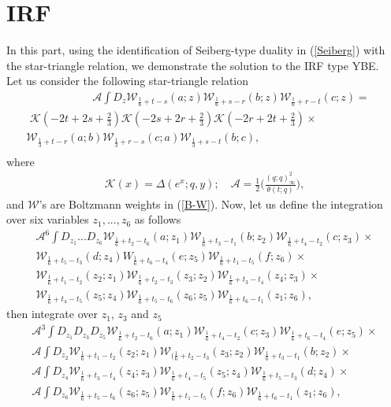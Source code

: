\documentclass[a4paper,11pt]{article}%
\numberwithin{equation}{section}
\begin{document}
\section{IRF } \label{AIRF} 
In this part, using the identification of  Seiberg-type duality in (\ref{Seiberg}) with the star-triangle relation, we demonstrate the solution to the IRF type YBE.\\Let us consider the following star-triangle relation
\begin{multline} \label{s-t1}
   \qquad \qquad  \qquad\mathcal{A}\int  D_z   \mathcal{W}_{\frac{1}{6}+t-s}(a;z)  \mathcal{W}_{\frac{1}{6}+s-r}(b;z)  \mathcal{W}_{\frac{1}{6}+r-t}(c;z)
     = \\ \,\,\mathcal{K}(-2t+2s+\frac{2}{3})\mathcal{K}(-2s+2r+\frac{2}{3})\mathcal{K}(-2r+2t+\frac{2}{3}) \times\qquad\qquad\qquad\\
      \mathcal{W}_{\frac{1}{3}+t-r}(a;b) \mathcal{W}_{\frac{1}{3}+r-s}(c;a) \mathcal{W}_{\frac{1}{3}+s-t}(b;c),\\
\end{multline}
where  
 \begin{align}
     \mathcal{K}(x)=\Delta(e^{x};q,y);\quad \mathcal{A}=\frac{1}{2}\Big(\frac{(q;q)^2_{\infty}}{\theta(t;q)}\Big),
\end{align}
and $\mathcal{W}$'s are Boltzmann weights in (\ref{B-W}). Now, let us define the integration over  six variables $z_1,...,z_6$  as follows
\begin{align} \label{six}\nonumber
  \mathcal{A}^6 \int D_{z_1}... D_{z_6}  \mathcal{W}_{\frac{1}{6}+t_2-t_6}(a;z_1) \mathcal{W}_{\frac{1}{6}+t_3-t_1}(b;z_2)  \mathcal{W}_{\frac{1}{6}+t_4-t_2}(c;z_3) \times \\\nonumber  \mathcal{W}_{\frac{1}{6}+t_5-t_3}(d;z_4)W_{\frac{1}{6}+t_6-t_4}(e;z_5) \mathcal{W}_{\frac{1}{6}+t_1-t_5}(f;z_6) \times  \\\nonumber \mathcal{W}_{\frac{1}{6}+t_1-t_2}(z_2;z_1)  \mathcal{W}_{\frac{1}{6}+t_2-t_3
  }(z_3;z_2)  \mathcal{W}_{\frac{1}{6}+t_3-t_4}(z_4;z_3) \times\\ 
   \mathcal{W}_{\frac{1}{6}+t_4-t_5}(z_5;z_4) 
  \mathcal{W}_{\frac{1}{6}+t_5-t_6}(z_6;z_5)  \mathcal{W}_{\frac{1}{6}+t_6-t_1}(z_1;z_6),
 \end{align}
 then integrate over  $z_1$,  $z_3$ and $z_5$ 
 \begin{align}\label{three}\nonumber
  \mathcal{A}^3 \int D_{z_1} D_{z_3}D_{z_5}  \mathcal{W}_{\frac{1}{6}+t_2-t_6}(a;z_1)  \mathcal{W}_{\frac{1}{6}+t_4-t_2}(c;z_3) \mathcal{W}_{\frac{1}{6}+t_6-t_4}(e;z_5) \times\\\nonumber  \mathcal{A} \int D_{z_2} \mathcal{W}_{\frac{1}{6}+t_1-t_2}(z_2;z_1)  \mathcal{W}_{(\frac{1}{6}+t_2-t_3
  }(z_3;z_2) \mathcal{W}_{\frac{1}{6}+t_3-t_1}(b;z_2) \times\\\nonumber 
   \mathcal{A} \int D_{z_4} \mathcal{W}_{\frac{1}{6}+t_3-t_4}(z_4;z_3)  \mathcal{W}_{\frac{1}{6}+t_4-t_5}(z_5;z_4) \mathcal{W}_{\frac{1}{6}+t_5-t_3}(d;z_4)\times\\ 
 \mathcal{A} \int D_{z_6} \mathcal{W}_{\frac{1}{6}+t_5-t_6}(z_6;z_5) \mathcal{W}_{\frac{1}{6}+t_1-t_5}(f;z_6) \mathcal{W}_{\frac{1}{6}+t_6-t_1}(z_1;z_6),
 \end{align}
\end{document}
